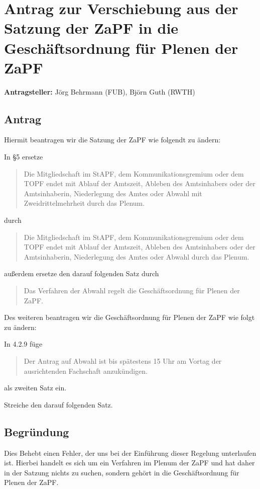 \documentclass[draft,10pt,oneside]{scrartcl}
\begin{document}
\section*{Antrag zur Verschiebung aus der Satzung der ZaPF in die
		Geschäftsordnung für Plenen der ZaPF}

\textbf{Antragsteller:} Jörg Behrmann (FUB), Björn Guth (RWTH)

\subsection*{Antrag}

Hiermit beantragen wir die Satzung der ZaPF wie folgendt zu ändern:

In §5 ersetze
\begin{quote}
	Die Mitgliedschaft im StAPF, dem Kommunikationsgremium oder dem TOPF endet
	mit Ablauf der Amtszeit, Ableben des Amtsinhabers oder der Amtsinhaberin,
	Niederlegung des Amtes oder Abwahl mit Zweidrittelmehrheit durch das
	Plenum.
\end{quote}
durch
\begin{quote}
	Die Mitgliedschaft im StAPF, dem Kommunikationsgremium oder dem TOPF endet
	mit Ablauf der Amtszeit, Ableben des Amtsinhabers oder der Amtsinhaberin,
	Niederlegung des Amtes oder Abwahl durch das Plenum.
\end{quote}
außerdem ersetze den darauf folgenden Satz durch
\begin{quote}
	Das Verfahren der Abwahl regelt die Geschäftsordnung für Plenen der ZaPF.
\end{quote}
\vspace{0.5cm}
Des weiteren beantragen wir die Geschäftsordnung für Plenen der ZaPF wie folgt
zu ändern:

In 4.2.9 füge
\begin{quote}
	Der Antrag auf Abwahl ist bis spätestens 15 Uhr am Vortag der ausrichtenden
	Fachschaft anzukündigen.
\end{quote}
als zweiten Satz ein.

Streiche den darauf folgenden Satz.

\subsection*{Begründung}
Dies Behebt einen Fehler, der uns bei der Einführung dieser Regelung
unterlaufen ist. Hierbei handelt es sich um ein Verfahren im Plenum der ZaPF
und hat daher in der Satzung nichts zu suchen, sondern gehört in die
Geschäftsordnung für Plenen der ZaPF.
\end{document}
